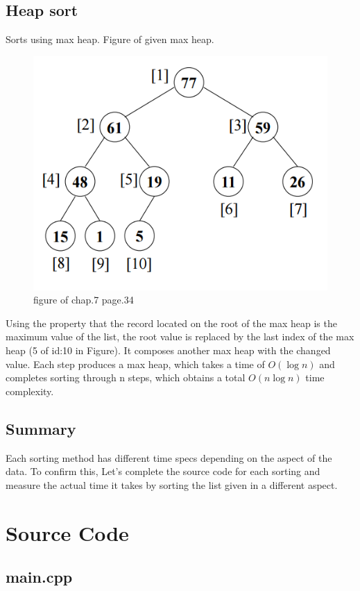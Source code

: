 \documentclass{article}
\begin{document}
\subsection{Heap sort}
Sorts using max heap.
Figure of given max heap.
\begin{figure}[H]\centering
\includegraphics[width=.9\linewidth]{heap.PNG}
\caption*{figure of chap.7 page.34}
\end{figure}
Using the property that the record located on the root of the max heap is the maximum value of the list, the root value is replaced by the last index of the max heap (5 of id:10 in Figure). It composes another max heap with the changed value. Each step produces a max heap, which takes a time of $O(\log n)$ and completes sorting through n steps, which obtains a total $O(n\log n)$ time complexity.
\subsection{Summary}
Each sorting method has different time specs depending on the aspect of the data. To confirm this, Let's complete the source code for each sorting and measure the actual time it takes by sorting the list given in a different aspect.
\pagebreak

\section{Source Code}

\subsection{main.cpp}

\end{document}
